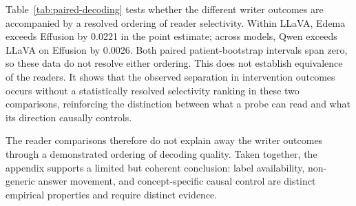 Table~\ref{tab:paired-decoding} tests whether the different writer outcomes
are accompanied by a resolved ordering of reader selectivity. Within
LLaVA, Edema exceeds Effusion by 0.0221 in the point estimate; across models,
Qwen exceeds LLaVA on Effusion by 0.0026. Both paired patient-bootstrap
intervals span zero, so these data do not resolve either ordering. This
does not establish equivalence of the readers. It shows that the observed
separation in intervention outcomes occurs without a statistically resolved
selectivity ranking in these two comparisons, reinforcing the distinction
between what a probe can read and what its direction causally controls.

\begin{table}[H]
\centering
\caption{Paired controlled-decoding contrasts.}
\label{tab:paired-decoding}
\end{table}

The reader comparisons therefore do not explain away the writer outcomes
through a demonstrated ordering of decoding quality. Taken together, the
appendix supports a limited but coherent conclusion: label availability,
non-generic answer movement, and concept-specific causal control are
distinct empirical properties and require distinct evidence.

\FloatBarrier

